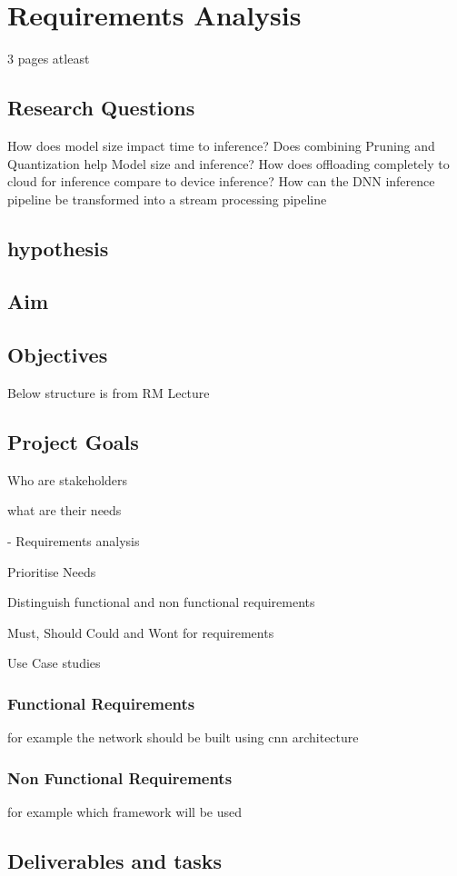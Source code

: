 \chapter{Requirements Analysis}
3 pages atleast



\section{Research Questions}
How does model size impact time to inference?
Does combining Pruning and Quantization help Model size and inference?
How does offloading completely to cloud for inference compare to device inference?
How can the DNN inference pipeline be transformed into a stream processing pipeline


\section{hypothesis}
\section{Aim}
\section{Objectives}
Below structure is from RM Lecture
\section{Project Goals}
Who are stakeholders

what are their needs

- Requirements analysis

Prioritise Needs

Distinguish functional and non functional requirements

Must, Should Could and Wont for requirements

Use Case studies
\subsection{Functional Requirements}
for example the network should be built using cnn architecture
\subsection{Non Functional Requirements}
for example which framework will be used

\section{Deliverables and tasks}
